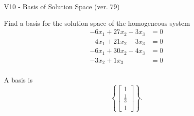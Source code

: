 \begin{exercise}
  \begin{exerciseTitle}V10 - Basis of Solution Space (ver. 79)\end{exerciseTitle}
  \begin{exerciseStatement}
    Find a basis for the solution space of the homogeneous system 
\begin{align*}
 -6 x_ 1 + 27 x_ 2 -3 x_ 3 &= 0  \\ 
  -4 x_ 1 + 21 x_ 2 -3 x_ 3 &= 0  \\ 
  -6 x_ 1 + 30 x_ 2 -4 x_ 3 &= 0  \\ 
  -3 x_ 2 + 1 x_ 3 &= 0  \\ 
 \end{align*}


 
  \end{exerciseStatement}

  \begin{exerciseAnswer}
   A basis is   
\[\left\{\left[\begin{array}{c}
1 \\
\frac{1}{3} \\
1
\end{array}\right]\right\}.\]

  


  \end{exerciseAnswer}
\end{exercise}